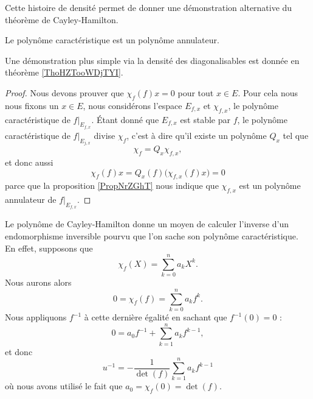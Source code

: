 Cette histoire de densité permet de donner une démonstration alternative du théorème de Cayley-Hamilton.
\begin{theorem}   \label{ThoCalYWLbJQ}
    Le polynôme caractéristique est un polynôme annulateur.
\end{theorem}

Une démonstration plus simple via la densité des diagonalisables est donnée en théorème \ref{ThoHZTooWDjTYI}.
\begin{proof}
    Nous devons prouver que \( \chi_f(f)x=0\) pour tout \( x\in E\). Pour cela nous nous fixons un \( x\in E\), nous considérons l'espace \( E_{f,x}\) et \( \chi_{f,x}\), le polynôme caractéristique de \( f|_{E_{f,x}}\). Étant donné que \( E_{f,x}\) est stable par \( f\), le polynôme caractéristique de \( f|_{E_{j,x}}\) divise \( \chi_f\), c'est à dire qu'il existe un polynôme \( Q_x\) tel que
    \begin{equation}
        \chi_f=Q_x\chi_{f,x},
    \end{equation}
    et donc aussi
    \begin{equation}
        \chi_f(f)x=Q_x(f)\big( \chi_{f,x}(f)x \big)=0
    \end{equation}
    parce que la proposition \ref{PropNrZGhT} nous indique que \( \chi_{f,x}\) est un polynôme annulateur de \( f|_{E_{f,x}}\).
\end{proof}

Le polynôme de Cayley-Hamilton donne un moyen de calculer l'inverse d'un endomorphisme inversible pourvu que l'on sache son polynôme caractéristique. En effet, supposons que
\begin{equation}
    \chi_f(X)=\sum_{k=0}^na_kX^k.
\end{equation}
Nous aurons alors
\begin{equation}
    0=\chi_f(f)=\sum_{k=0}^na_kf^k.
\end{equation}
Nous appliquons \( f^{-1}\) à cette dernière égalité en sachant que \( f^{-1}(0)=0\) :
\begin{equation}
    0=a_0f^{-1}+\sum_{k=1}^na_kf^{k-1},
\end{equation}
et donc
\begin{equation}
    u^{-1}=-\frac{1}{ \det(f) }\sum_{k=1}^na_kf^{k-1}
\end{equation}
où nous avons utilisé le fait que \( a_0=\chi_f(0)=\det(f)\).

